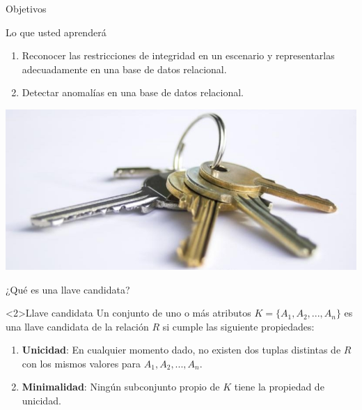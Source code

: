 


\begin{frame}{Objetivos}
    \begin{block}{Lo que usted aprender\'a}
    \begin{enumerate}[<+->]
        \item Reconocer las restricciones de integridad en un escenario y representarlas adecuadamente en una base de datos relacional.  

        \item Detectar anomal\'ias en una base de datos relacional. 
    \end{enumerate}
    \end{block}
\end{frame}


{
{
    \includegraphics[width=\paperwidth,height=\paperheight]{img/the-keys-to.jpg}
}
\begin{frame}
\end{frame}
}



\begin{frame}{¿Qu\'e es una llave candidata?}
    \begin{block}<2>{Llave candidata}
        Un conjunto de uno o m\'as atributos $K = \{A_1,A_2,...,A_n\}$ es una llave candidata
        de la relaci\'on $R$ si cumple las siguiente propiedades:
        \begin{enumerate}
            \item \textbf{Unicidad}: En cualquier momento dado, no existen dos tuplas
            distintas de $R$ con los mismos valores para $A_1,A_2,...,A_n$.
            \item \textbf{Minimalidad}: Ning\'un subconjunto propio de $K$ tiene la
            propiedad de unicidad.
        \end{enumerate}
    \end{block}
\end{frame}


